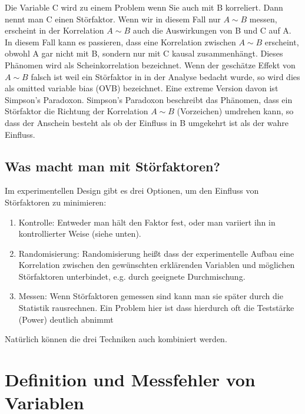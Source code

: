 \documentclass[a4paper,twoside]{tufte-book}\usepackage[]{graphicx}\usepackage[]{color}
\begin{document}
Die Variable C wird zu einem Problem wenn Sie auch mit B korreliert. Dann nennt man C einen Störfaktor. Wenn wir in diesem Fall nur $A  \sim B$ messen, erscheint in der Korrelation $A \sim B$ auch die Auswirkungen von B und C auf A. In diesem Fall kann es passieren, dass eine Korrelation zwischen $A \sim B$ erscheint, obwohl A gar nicht mit B, sondern nur mit C kausal zusammenhängt. Dieses Phänomen wird als Scheinkorrelation bezeichnet. Wenn der geschätze Effekt von $A \sim B$ falsch ist weil ein Störfaktor in in der Analyse bedacht wurde, so wird dies als omitted variable bias (OVB) bezeichnet. Eine extreme Version davon ist Simpson's Paradoxon. Simpson's Paradoxon beschreibt das Phänomen, dass ein Störfaktor die Richtung der Korrelation $A \sim B$ (Vorzeichen) umdrehen kann, so dass der Anschein besteht als ob der Einfluss in B umgekehrt ist als der wahre Einfluss. 


\subsection{Was macht man mit Störfaktoren?}

Im experimentellen Design gibt es drei Optionen, um den Einfluss von Störfaktoren zu minimieren:

\begin{enumerate}
\item Kontrolle: Entweder man hält den Faktor fest, oder man variiert ihn in kontrollierter Weise (siehe unten).
\item Randomisierung: Randomisierung heißt dass der experimentelle Aufbau eine Korrelation zwischen den gewünschten erklärenden Variablen und möglichen Störfaktoren unterbindet, e.g. durch geeignete Durchmischung. 
\item Messen: Wenn Störfaktoren gemessen sind kann man sie später durch die Statistik rausrechnen. Ein Problem hier ist dass hierdurch oft die Teststärke (Power) deutlich abnimmt
\end{enumerate}

Natürlich können die drei Techniken auch kombiniert werden. 


\section{Definition und Messfehler von Variablen}
\end{document}
